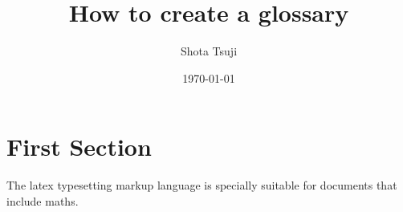 \documentclass{article}
\title{How to create a glossary}
\author{Shota Tsuji}
\date{\today}
\begin{document}
\maketitle
\newpage

\tableofcontents
\clearpage

\section{First Section}
The \Gls{latex} typesetting markup language is specially suitable
for documents that include \gls{maths}.

\clearpage

\glsaddall
\printglossary
\end{document}
